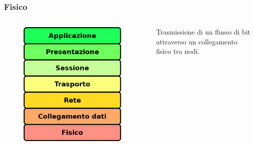 \documentclass{beamer}
\begin{document}
\subsubsection*{Fisico}
\begin{frame}{\insertsection}{\insertsubsection}
\begin{columns}
\begin{figure}
\includegraphics[width=0.95\textwidth]{imgs/01-iso-osi.drawio.png}
\end{figure}
\begin{block}{\insertsubsubsection}
Trasmissione di un flusso di bit attraverso un collegamento fisico tra nodi.
\end{block}
\end{columns}
\end{frame}
\end{document}

